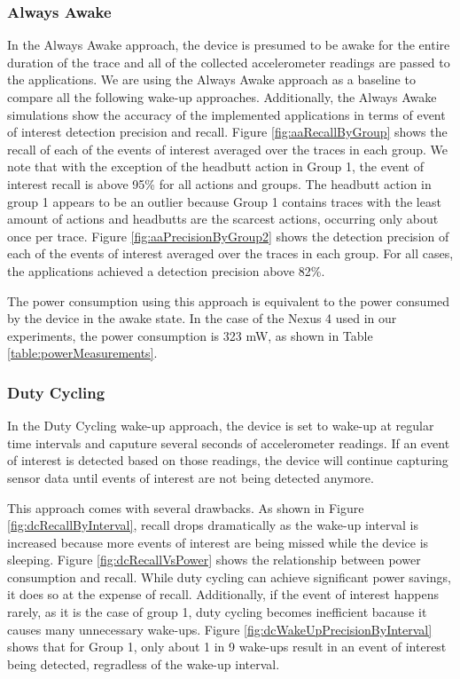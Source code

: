 \subsubsection{Always Awake}

In the Always Awake approach, the device is presumed to be awake for the entire duration of the trace and all of the collected accelerometer readings are passed to the applications. We are using the Always Awake approach as a baseline to compare all the following wake-up approaches. Additionally, the Always Awake simulations show the accuracy of the implemented applications in terms of event of interest detection precision and recall. Figure \ref{fig:aaRecallByGroup} shows the recall of each of the events of interest averaged over the traces in each group. We note that with the exception of the headbutt action in Group 1, the event of interest recall is above 95\% for all actions and groups. The headbutt action in group 1 appears to be an outlier because Group 1 contains traces with the least amount of actions and headbutts are the scarcest actions, occurring only about once per trace. Figure \ref{fig:aaPrecisionByGroup2} shows the detection precision of each of the events of interest averaged over the traces in each group. For all cases, the applications achieved a detection precision above 82\%.

The power consumption using this approach is equivalent to the power consumed by the device in the awake state. In the case of the Nexus 4 used in our experiments, the power consumption is 323 mW, as shown in Table \ref{table:powerMeasurements}.

\subsubsection{Duty Cycling}

In the Duty Cycling wake-up approach, the device is set to wake-up at regular time intervals and caputure several seconds of accelerometer readings. If an event of interest is detected based on those readings, the device will continue capturing sensor data until events of interest are not being detected anymore. 

This approach comes with several drawbacks. As shown in Figure \ref{fig:dcRecallByInterval}, recall drops dramatically as the wake-up interval is increased because more events of interest are being missed while the device is sleeping. Figure \ref{fig:dcRecallVsPower} shows the relationship between power consumption and recall. While duty cycling can achieve significant power savings, it does so at the expense of recall. Additionally, if the event of interest happens rarely, as it is the case of group 1, duty cycling becomes inefficient bacause it causes many unnecessary wake-ups. Figure \ref{fig:dcWakeUpPrecisionByInterval} shows that for Group 1, only about 1 in 9 wake-ups result in an event of interest being detected, regradless of the wake-up interval.

